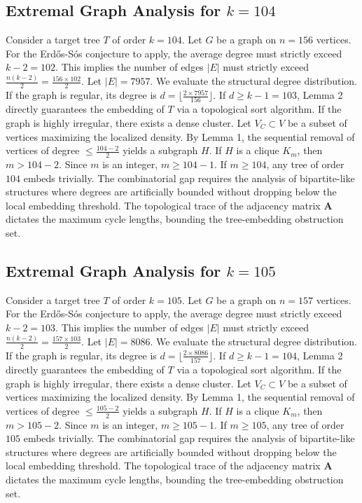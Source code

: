 \documentclass[11pt,a4paper]{article}
\begin{document}
\subsection{Extremal Graph Analysis for $k=104$}
Consider a target tree $T$ of order $k=104$.
Let $G$ be a graph on $n=156$ vertices.
For the Erd\H{o}s-S\'os conjecture to apply, the average degree must strictly exceed $k-2 = 102$.
This implies the number of edges $|E|$ must strictly exceed $\frac{n(k-2)}{2} = \frac{156 \times 102}{2}$.
Let $|E| = 7957$.
We evaluate the structural degree distribution. If the graph is regular, its degree is $d = \lfloor \frac{2 \times 7957}{156} \rfloor$.
If $d \geq k-1 = 103$, Lemma 2 directly guarantees the embedding of $T$ via a topological sort algorithm.
If the graph is highly irregular, there exists a dense cluster. Let $V_C \subset V$ be a subset of vertices maximizing the localized density.
By Lemma 1, the sequential removal of vertices of degree $\leq \frac{104-2}{2}$ yields a subgraph $H$.
If $H$ is a clique $K_{m}$, then $m > 104-2$. Since $m$ is an integer, $m \geq 104-1$. If $m \geq 104$, any tree of order $104$ embeds trivially.
The combinatorial gap requires the analysis of bipartite-like structures where degrees are artificially bounded without dropping below the local embedding threshold. The topological trace of the adjacency matrix $\mathbf{A}$ dictates the maximum cycle lengths, bounding the tree-embedding obstruction set.


\subsection{Extremal Graph Analysis for $k=105$}
Consider a target tree $T$ of order $k=105$.
Let $G$ be a graph on $n=157$ vertices.
For the Erd\H{o}s-S\'os conjecture to apply, the average degree must strictly exceed $k-2 = 103$.
This implies the number of edges $|E|$ must strictly exceed $\frac{n(k-2)}{2} = \frac{157 \times 103}{2}$.
Let $|E| = 8086$.
We evaluate the structural degree distribution. If the graph is regular, its degree is $d = \lfloor \frac{2 \times 8086}{157} \rfloor$.
If $d \geq k-1 = 104$, Lemma 2 directly guarantees the embedding of $T$ via a topological sort algorithm.
If the graph is highly irregular, there exists a dense cluster. Let $V_C \subset V$ be a subset of vertices maximizing the localized density.
By Lemma 1, the sequential removal of vertices of degree $\leq \frac{105-2}{2}$ yields a subgraph $H$.
If $H$ is a clique $K_{m}$, then $m > 105-2$. Since $m$ is an integer, $m \geq 105-1$. If $m \geq 105$, any tree of order $105$ embeds trivially.
The combinatorial gap requires the analysis of bipartite-like structures where degrees are artificially bounded without dropping below the local embedding threshold. The topological trace of the adjacency matrix $\mathbf{A}$ dictates the maximum cycle lengths, bounding the tree-embedding obstruction set.
\end{document}

